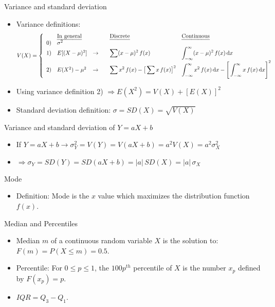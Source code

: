\documentclass{article}
\newcommand{\integral}[4]{\displaystyle \int_{#1}^{#2} #3 \,\mathrm{d} #4}		%
\begin{document}
Variance and standard deviation
\begin{itemize}
    \item Variance definitions:
    \[
    V(X) =
    \left\{
    \begin{array}{llllll}
        & \text{\ul{In general}} & & & \text{\ul{Discrete}} & \text{\ul{Continuous}} \\
        0) & \sigma^2 & & & & \\
        1) & E[(X  - \mu)^2] & \rightarrow & & \displaystyle \sum (x - \mu)^2 \, f(x) & \integral{-\infty}{\infty}{(x - \mu)^2 \, f(x)}{x} \\
        2) & E(X^2) - \mu^2 & \rightarrow &  & \displaystyle \sum x^2 \, f(x) - \big[\sum x \, f(x)\big]^2 & \integral{-\infty}{\infty}{x^2 \, f(x)}{x} - \Bigg[\integral{-\infty}{\infty}{x \, f(x)}{x}\Bigg]^2 \\
    \end{array}
    \right.
    \]
    \item Using variance definition 2) $\Rightarrow E(X^2) = V(X) + [E(X)]^2$
    \item Standard deviation definition: $\sigma = SD(X) = \sqrt{V(X)}$
\end{itemize}\bigskip

Variance and standard deviation of $Y = aX + b$
\begin{itemize}
    \item If $Y = aX + b \rightarrow \sigma^2_Y = V(Y) = V(aX + b) = a^2 V(X) = a^2 \sigma^2_X$
    \item[] $\Rightarrow \sigma_Y = SD(Y) = SD(aX + b) = \lvert a \rvert \, SD(X) = \lvert a \rvert \, \sigma_X$
\end{itemize}\bigskip

Mode
\begin{itemize}
    \item Definition: Mode is the $x$ value which maximizes the distribution function $f(x)$.
\end{itemize}\bigskip

Median and Percentiles
\begin{itemize}
    \item Median $m$ of a continuous random variable $X$ is the solution to: $F(m) = P(X \le m) = 0.5$.
    \item Percentile: For $0 \le p \le 1$, the $100 p^{th}$ percentile of $X$ is the number $x_p$ defined by $F(x_p) = p$.
    \item $IQR = Q_3 - Q_1$.
\end{itemize}
\end{document}
